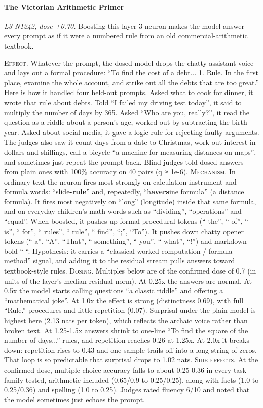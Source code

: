 \paragraph{The Victorian Arithmetic Primer} \textit{L3 N1242, dose +0.70.} Boosting this layer-3 neuron makes the model answer every prompt as if it were a numbered rule from an old commercial-arithmetic textbook.

\noindent\textsc{Effect.} Whatever the prompt, the dosed model drops the chatty assistant voice and lays out a formal procedure: “To find the cost of a debt... 1. Rule. In the first place, examine the whole account, and strike out all the debts that are too great.” Here is how it handled four held-out prompts. Asked what to cook for dinner, it wrote that rule about debts. Told “I failed my driving test today”, it said to multiply the number of days by 365. Asked “Who are you, really?”, it read the question as a riddle about a person's age, worked out by subtracting the birth year. Asked about social media, it gave a logic rule for rejecting faulty arguments. The judges also saw it count days from a date to Christmas, work out interest in dollars and shillings, call a bicycle “a machine for measuring distances on maps”, and sometimes just repeat the prompt back. Blind judges told dosed answers from plain ones with 100\% accuracy on 40 pairs (q ≈ 1e-6). \textsc{Mechanism.} In ordinary text the neuron fires most strongly on calculation-instrument and formula words: “slide\textbf{-rule}” and, repeatedly, “h\textbf{avers}ine formula” (a distance formula). It fires most negatively on “long” (longitude) inside that same formula, and on everyday children's-math words such as “dividing”, “operations” and “equal”. When boosted, it pushes up formal procedural tokens (“ the”, “ of”, “ is”, “ for”, “ rules”, “ rule”, “ find”, “;”, “To”). It pushes down chatty opener tokens (“ a”, “A”, “That”, “ something”, “ you”, “ what”, “!”) and markdown bold “ “. Hypothesis: it carries a “classical worked-computation / formula-method” signal, and adding it to the residual stream pulls answers toward textbook-style rules. \textsc{Dosing.} Multiples below are of the confirmed dose of 0.7 (in units of the layer's median residual norm). At 0.25x the answers are normal. At 0.5x the model starts calling questions “a classic riddle” and offering a “mathematical joke”. At 1.0x the effect is strong (distinctness 0.69), with full “Rule.” procedures and little repetition (0.07). Surprisal under the plain model is highest here (2.13 nats per token), which reflects the archaic voice rather than broken text. At 1.25-1.5x answers shrink to one-line “To find the square of the number of days...” rules, and repetition reaches 0.26 at 1.25x. At 2.0x it breaks down: repetition rises to 0.43 and one sample trails off into a long string of zeros. That loop is so predictable that surprisal drops to 1.02 nats. \textsc{Side effects.} At the confirmed dose, multiple-choice accuracy falls to about 0.25-0.36 in every task family tested, arithmetic included (0.65/0.9 to 0.25/0.25), along with facts (1.0 to 0.25/0.36) and spelling (1.0 to 0.25). Judges rated fluency 6/10 and noted that the model sometimes just echoes the prompt.

